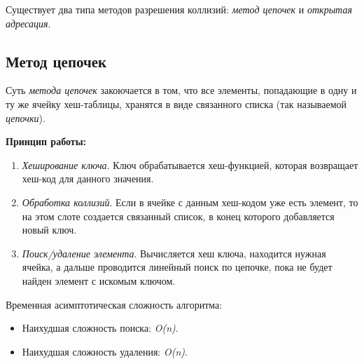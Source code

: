 Существует два типа методов разрешения коллизий: \textit{метод цепочек} и \textit{открытая адресация}.

\subsection{Метод цепочек} \label{sec:chain_method}

Суть \textit{метода цепочек} закоючается в том, что все элементы, попадающие в одну и ту же ячейку хеш-таблицы, хранятся в виде связанного списка (так называемой \textit{цепочки}).\par
\textbf{Принцип работы:}
\begin{enumerate}[font=\scriptsize, noitemsep, topsep=0pt, , partopsep=0pt]
	\item {\footnotesize \textit{Хеширование ключа}. Ключ обрабатывается хеш-функцией, которая возвращает хеш-код для данного значения.}
	\item {\footnotesize \textit{Обработка коллизий}. Если в ячейке с данным хеш-кодом уже есть элемент, то на этом слоте создается связанный список, в конец которого добавляется новый ключ.}
	\item {\footnotesize \textit{Поиск/удаление элемента}. Вычисляется хеш ключа, находится нужная ячейка, а дальше проводится линейный поиск по цепочке, пока не будет найден элемент с искомым ключом.}
\end{enumerate}
\vspace{5pt}

Временная асимптотическая сложность алгоритма: 
\begin{itemize}[label=$\triangleright$, font=\scriptsize, noitemsep, topsep=0pt, , partopsep=0pt]
	\item {\footnotesize Наихудшая сложность поиска: \textit{O(n)}.}
	\item {\footnotesize Наихудшая сложность удаления: \textit{O(n)}.}
\end{itemize}
\vspace{5pt}

